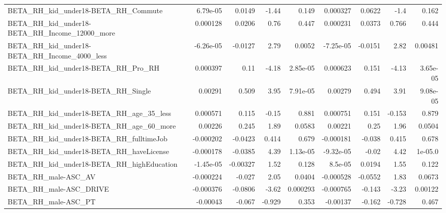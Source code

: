 \begin{tabular}{lrrrrrrrr}
BETA\_RH\_kid\_under18-BETA\_RH\_Commute                &    6.79e-05 &       0.0149 &     -1.44 &    0.149 &   0.000327 &      0.0622 &         -1.4 &         0.162 \\
BETA\_RH\_kid\_under18-BETA\_RH\_Income\_12000\_more      &    0.000128 &       0.0206 &      0.76 &    0.447 &   0.000231 &      0.0373 &        0.766 &         0.444 \\
BETA\_RH\_kid\_under18-BETA\_RH\_Income\_4000\_less       &   -6.26e-05 &      -0.0127 &      2.79 &   0.0052 &  -7.25e-05 &     -0.0151 &         2.82 &       0.00481 \\
BETA\_RH\_kid\_under18-BETA\_RH\_Pro\_RH                 &    0.000397 &         0.11 &     -4.18 & 2.85e-05 &   0.000623 &       0.151 &        -4.13 &      3.65e-05 \\
BETA\_RH\_kid\_under18-BETA\_RH\_Single                 &     0.00291 &        0.509 &      3.95 & 7.91e-05 &    0.00279 &       0.494 &         3.91 &      9.08e-05 \\
BETA\_RH\_kid\_under18-BETA\_RH\_age\_35\_less            &    0.000571 &        0.115 &     -0.15 &    0.881 &   0.000751 &       0.151 &       -0.153 &         0.879 \\
BETA\_RH\_kid\_under18-BETA\_RH\_age\_60\_more            &     0.00226 &        0.245 &      1.89 &   0.0583 &    0.00221 &        0.25 &         1.96 &        0.0504 \\
BETA\_RH\_kid\_under18-BETA\_RH\_fulltimeJob            &   -0.000202 &      -0.0423 &     0.414 &    0.679 &  -0.000181 &      -0.038 &        0.415 &         0.678 \\
BETA\_RH\_kid\_under18-BETA\_RH\_haveLicense            &   -0.000178 &      -0.0385 &      4.39 & 1.13e-05 &  -9.32e-05 &       -0.02 &         4.42 &       1e-05.0 \\
BETA\_RH\_kid\_under18-BETA\_RH\_highEducation          &   -1.45e-05 &     -0.00327 &      1.52 &    0.128 &    8.5e-05 &      0.0194 &         1.55 &         0.122 \\
BETA\_RH\_male-ASC\_AV                                &   -0.000224 &       -0.027 &      2.05 &   0.0404 &  -0.000528 &     -0.0552 &         1.83 &        0.0673 \\
BETA\_RH\_male-ASC\_DRIVE                             &   -0.000376 &      -0.0806 &     -3.62 & 0.000293 &  -0.000765 &      -0.143 &        -3.23 &       0.00122 \\
BETA\_RH\_male-ASC\_PT                                &    -0.00043 &       -0.067 &    -0.929 &    0.353 &   -0.00137 &      -0.162 &       -0.728 &         0.467 \\

\end{tabular}
